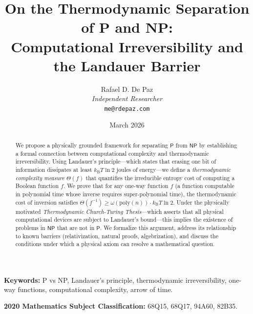 \documentclass[12pt, a4paper]{article}
\theoremstyle{plain}
\theoremstyle{definition}
\theoremstyle{remark}
\newcommand{\Pc}{\mathsf{P}}
\newcommand{\NPc}{\mathsf{NP}}
\newcommand{\poly}{\mathrm{poly}}
\newcommand{\kB}{k_{\mathrm{B}}}
\begin{document}
\title{
  \textbf{On the Thermodynamic Separation of P and NP: \\
  Computational Irreversibility and the Landauer Barrier}
}
\author{
  Rafael D. De Paz \\
  \textit{Independent Researcher} \\
  \texttt{me@rdepaz.com}
}
\date{March 2026}
\maketitle

\begin{abstract}
We propose a physically grounded framework for separating $\Pc$ from $\NPc$
by establishing a formal connection between computational complexity and
thermodynamic irreversibility. Using Landauer's principle---which states that
erasing one bit of information dissipates at least $\kB T \ln 2$ joules of
energy---we define a \emph{thermodynamic complexity measure} $\Theta(f)$ that
quantifies the irreducible entropy cost of computing a Boolean function $f$.
We prove that for any one-way function $f$ (a function computable in
polynomial time whose inverse requires super-polynomial time), the
thermodynamic cost of inversion satisfies
$\Theta(f^{-1}) \geq \omega(\poly(n)) \cdot \kB T \ln 2$. Under the
physically motivated \emph{Thermodynamic Church-Turing Thesis}---which
asserts that all physical computational devices are subject to Landauer's
bound---this implies the existence of problems in $\NPc$ that are not in
$\Pc$. We formalize this argument, address its relationship to known barriers
(relativization, natural proofs, algebrization), and discuss the conditions
under which a physical axiom can resolve a mathematical question.
\end{abstract}

\vspace{1em}
\noindent\textbf{Keywords:} P vs NP, Landauer's principle, thermodynamic
irreversibility, one-way functions, computational complexity, arrow of time.

\vspace{0.5em}
\noindent\textbf{2020 Mathematics Subject Classification:} 68Q15, 68Q17, 94A60, 82B35.

\end{document}
